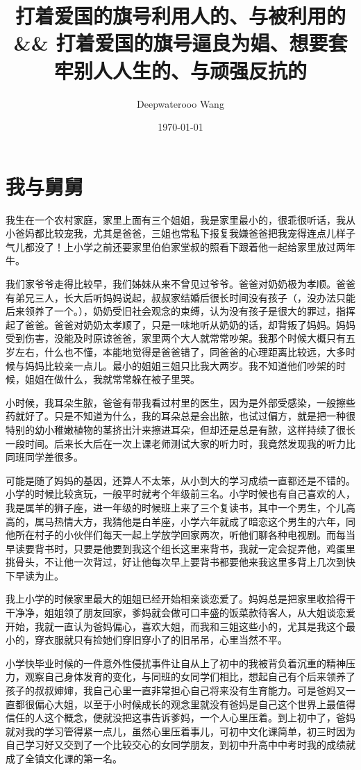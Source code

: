 \documentclass[9pt, b5paper]{article}
\author{Deepwaterooo Wang}
\date{\today}
\title{打着爱国的旗号利用人的、与被利用的 \&\& 打着爱国的旗号逼良为娼、想要套牢别人人生的、与顽强反抗的}
\begin{document}
\maketitle
\tableofcontents


\section{我与舅舅}
\label{sec-1}

我生在一个农村家庭，家里上面有三个姐姐，我是家里最小的，很乖很听话，我从小爸妈都比较宠我，尤其是爸爸，三姐也常私下报复我嫌爸爸把我宠得连点儿样子气儿都没了！上小学之前还要家里伯伯家堂叔的照看下跟着他一起给家里放过两年牛。　

我们家爷爷走得比较早，我们姊妹从来不曾见过爷爷。爸爸对奶奶极为孝顺。爸爸有弟兄三人，长大后听妈妈说起，叔叔家结婚后很长时间没有孩子（，没办法只能后来领养了一个。），奶奶受旧社会观念的束缚，认为没有孩子是很大的罪过，指挥起了爸爸。爸爸对奶奶太孝顺了，只是一味地听从奶奶的话，却背叛了妈妈。妈妈受到伤害，没能及时原谅爸爸，家里两个大人就常常吵架。我那个时候大概只有五岁左右，什么也不懂，本能地觉得是爸爸错了，同爸爸的心理距离比较远，大多时候与妈妈比较亲一点儿。最小的姐姐三姐只比我大两岁。我不知道他们吵架的时候，姐姐在做什么，我就常常躲在被子里哭。

小时候，我耳朵生脓，爸爸有带我看过村里的医生，因为是外部受感染，一般擦些药就好了。只是不知道为什么，我的耳朵总是会出脓，也试过偏方，就是把一种很特别的幼小稚嫩植物的茎挤出汁来擦进耳朵，但却还是总是有脓，这样持续了很长一段时间。后来长大后在一次上课老师测试大家的听力时，我竟然发现我的听力比同班同学差很多。　

可能是随了妈妈的基因，还算人不太笨，从小到大的学习成绩一直都还是不错的。小学的时候比较贪玩，一般平时就考个年级前三名。小学时候也有自己喜欢的人，我是属羊的狮子座，进一年级的时候班上来了三个复读书，其中一个男生，个儿高高的，属马热情大方，我猜他是白羊座，小学六年就成了暗恋这个男生的六年，同他所在村子的小伙伴们每天一起上学放学回家两次，听他们聊各种电视剧。而每当早读要背书时，只要是他要到我这个组长这里来背书，我就一定会捉弄他，鸡蛋里挑骨头，不让他一次背过，好让他每次早上要背书都要他来我这里多背上几次到快下早读为止。

我上小学的时候家里最大的姐姐已经开始相亲谈恋爱了。妈妈总是把家里收拾得干干净净，姐姐领了朋友回家，爹妈就会做可口丰盛的饭菜款待客人，从大姐谈恋爱开始，我就一直认为爸妈偏心，喜欢大姐，而我和三姐这些小的，尤其是我这个最小的，穿衣服就只有捡她们穿旧穿小了的旧吊吊，心里当然不平。

小学快毕业时候的一件意外性侵扰事件让自从上了初中的我被背负着沉重的精神压力，观察自己身体发育的变化，与同班的女同学们相比，想起自己有个后来领养了孩子的叔叔婶婶，我自己心里一直非常担心自己将来没有生育能力。可是爸妈又一直都很偏心大姐，以至于小时候成长的观念里就没有爸妈是自己这个世界上最值得信任的人这个概念，便就没把这事告诉爹妈，一个人心里压着。到上初中了，爸妈就对我的学习管得紧一点儿，虽然心里压着事儿，可初中文化课简单，初三时因为自己学习好又交到了一个比较交心的女同学朋友，到初中升高中中考时我的成绩就成了全镇文化课的第一名。
\end{document}
